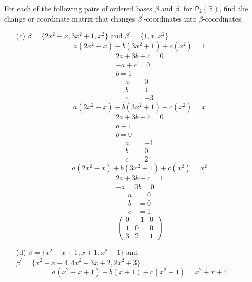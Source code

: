 For each of the following pairs of ordered bases $\beta$ and $\beta^\prime$
for $\mathsf{P}_2(\mathbb{R})$, find the change or coordinate matrix
that changes $\beta^\prime$-coordinates into $\beta$-coordinates.
\begin{enumerate}[(a)]
\item[(c)] $\beta = \{2x^2-x,3x^2+1,x^2\}$ and $\beta^\prime = \{1,x,x^2\}$
\begin{equation}
a(2x^2-x) + b(3x^2 +1) +c(x^2) =1 
\end{equation}
\begin{gather}
2a+3b+c = 0\\
-a +c = 0\\
b = 1
\end{gather}
\begin{align}
a&=0\\
b&=1\\
c&=-3
\end{align}
\begin{equation}
a(2x^2-x) + b(3x^2+1) +c(x^2) = x
\end{equation}
\begin{gather}
2a + 3b +c = 0\\
a +1 \\
b = 0
\end{gather}
\begin{align}
a&=-1\\
b&=0\\
c&=2
\end{align}
\begin{equation}
a(2x^2-x) +b(3x^2+1) +c(x^2) = x^2
\end{equation}
\begin{gather}
2a +3b +c = 1\\
-a = 0
b = 0
\end{gather}
\begin{align}
a&=0\\
b&=0\\
c&=1
\end{align}
\begin{equation}
\begin{pmatrix}
0&-1&0\\
1&0&0\\
3&2&1
\end{pmatrix}
\end{equation}
\item[(d)] $\beta = \{x^2 -x+1,x+1,x^2+1\}$ 
  and $\beta^\prime = \{x^2 +x+4,4x^2-3x+2,2x^2+3\}$
\begin{equation}
a(x^2-x+1) + b(x+1) + c(x^2 + 1) = x^2 +x +4

\end{equation}
\end{enumerate}
